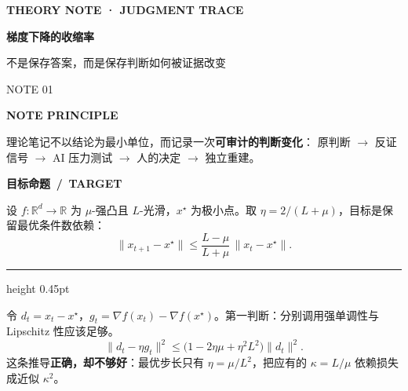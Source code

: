 \documentclass[10pt,fontset=none]{ctexart}
\newcommand{\Kicker}[2]{%
  {\rmfamily\bfseries\scriptsize\color{#1}#2}\par\vspace{0.18em}}
\newcommand{\SectionRule}[2]{%
  \vspace{0.28em}
  \noindent{\rmfamily\bfseries\large\color{#1}#2}\hspace{0.7em}%
  {\color{line}\leaders\hrule height 0.45pt\hfill\kern0pt}\par
  \vspace{0.18em}}
\begin{document}
\begin{minipage}[t]{0.71\linewidth}
  \Kicker{blue}{THEORY NOTE · JUDGMENT TRACE}
  {\bfseries\fontsize{24pt}{27pt}\selectfont\color{navy}
    梯度下降的收缩率\par}
  \vspace{0.12em}
  {\large\color{muted}不是保存答案，而是保存判断如何被证据改变}
\end{minipage}\hfill
\begin{minipage}[t]{0.25\linewidth}
  \raggedleft
  {\sffamily\scriptsize\color{muted}NOTE 01}\par
  \vspace{0.18em}{\color{line}\rule{0.78\linewidth}{0.5pt}}\par
  \par
\end{minipage}

\vspace{0.28em}
\begin{tcolorbox}[principle]
  \Kicker{blue}{NOTE PRINCIPLE}
  理论笔记不以结论为最小单位，而记录一次\textbf{可审计的判断变化}：
  原判断 $\rightarrow$ 反证信号 $\rightarrow$ AI 压力测试 $\rightarrow$ 人的决定 $\rightarrow$ 独立重建。
\end{tcolorbox}

\vspace{0.08em}
\begin{tcolorbox}[theorem]
  \Kicker{navy}{目标命题 \,/\, TARGET}
  设 $f:\mathbb R^d\to\mathbb R$ 为 $\mu$-强凸且 $L$-光滑，$x^\star$ 为极小点。取
  $\eta=2/(L+\mu)$，目标是保留最优条件数依赖：
  \[
    \|x_{t+1}-x^\star\|
    \le \frac{L-\mu}{L+\mu}\,\|x_t-x^\star\|.
  \]
\end{tcolorbox}

\SectionRule{navy}{1\quad 起点：我原本相信什么}

令 $d_t=x_t-x^\star$，$g_t=\nabla f(x_t)-\nabla f(x^\star)$。第一判断：分别调用强单调性与 Lipschitz 性应该足够。
\[
\|d_t-\eta g_t\|^2
\le \bigl(1-2\eta\mu+\eta^2L^2\bigr)\|d_t\|^2.
\]
这条推导\textbf{正确，却不够好}：最优步长只有 $\eta=\mu/L^2$，把应有的 $\kappa=L/\mu$ 依赖损失成近似 $\kappa^2$。
\end{document}
